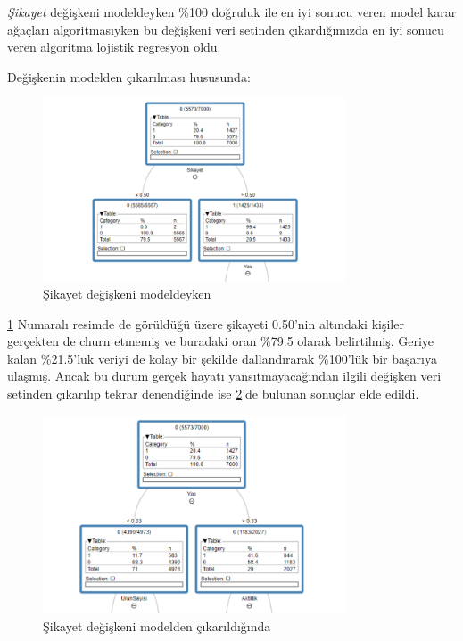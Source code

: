 \documentclass{article}
\begin{document}
\textit{Şikayet} değişkeni modeldeyken \%100 doğruluk ile en iyi sonucu veren model karar ağaçları algoritmasıyken bu değişkeni veri setinden çıkardığımızda en iyi sonucu veren algoritma lojistik regresyon oldu.

Değişkenin modelden çıkarılması hususunda:

\begin{figure}[htbp]
    \centering
    \includegraphics[width=0.8\textwidth]{Images/dt1.png}
    \caption{Şikayet değişkeni modeldeyken}
    \label{Karar Ağaçları 1}
\end{figure}

\ref{Karar Ağaçları 1} Numaralı resimde de görüldüğü üzere şikayeti 0.50'nin altındaki kişiler gerçekten de churn etmemiş ve buradaki oran \%79.5 olarak belirtilmiş. Geriye kalan \%21.5'luk veriyi de kolay bir şekilde dallandırarak \%100'lük bir başarıya ulaşmış. Ancak bu durum gerçek hayatı yansıtmayacağından ilgili değişken veri setinden çıkarılıp tekrar denendiğinde ise \ref{Karar Ağaçları 2}'de bulunan sonuçlar elde edildi.
\clearpage

\begin{figure}[htbp]
    \centering
    \includegraphics[width=0.8\textwidth]{Images/dt2.png}
    \caption{Şikayet değişkeni modelden çıkarıldığında}
    \label{Karar Ağaçları 2}
\end{figure}
\end{document}
